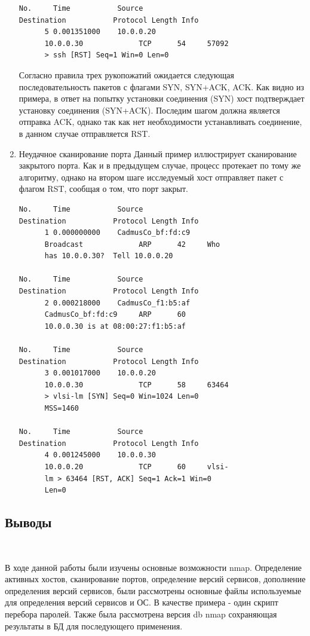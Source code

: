 \documentclass{article}
\begin{document}
\begin{enumerate}
\begin{verbatim}
No.     Time           Source                
Destination           Protocol Length Info
      5 0.001351000    10.0.0.20             
      10.0.0.30             TCP      54     57092 
      > ssh [RST] Seq=1 Win=0 Len=0
\end{verbatim}
Согласно правила трех рукопожатий ожидается следующая последовательность пакетов с флагами SYN, SYN+ACK, ACK. Как видно из примера, в ответ на попытку установки соединения (SYN) хост подтверждает установку соединения (SYN+ACK). Последим шагом должна является отправка ACK, однако так как нет необходимости устанавливать соединение, в данном случае отправляется RST.

\item Неудачное сканирование порта
Данный пример иллюстрирует сканирование закрытого порта. Как и в предыдущем случае, процесс протекает по тому же алгоритму, однако на втором шаге исследуемый хост отправляет пакет с флагом RST, сообщая о том, что порт закрыт.
\begin{verbatim}
No.     Time           Source                
Destination           Protocol Length Info
      1 0.000000000    CadmusCo_bf:fd:c9     
      Broadcast             ARP      42     Who 
      has 10.0.0.30?  Tell 10.0.0.20

No.     Time           Source                
Destination           Protocol Length Info
      2 0.000218000    CadmusCo_f1:b5:af     
      CadmusCo_bf:fd:c9     ARP      60     
      10.0.0.30 is at 08:00:27:f1:b5:af

No.     Time           Source                
Destination           Protocol Length Info
      3 0.001017000    10.0.0.20             
      10.0.0.30             TCP      58     63464 
      > vlsi-lm [SYN] Seq=0 Win=1024 Len=0 
      MSS=1460

No.     Time           Source                
Destination           Protocol Length Info
      4 0.001245000    10.0.0.30             
      10.0.0.20             TCP      60     vlsi-
      lm > 63464 [RST, ACK] Seq=1 Ack=1 Win=0 
      Len=0
\end{verbatim}

\end{enumerate}

\subsection{Выводы}
~

В ходе данной работы были изучены основные возможности nmap. Определение активных хостов, сканирование портов, определение версий сервисов, дополнение определения версий сервисов, были рассмотрены основные файлы используемые для определения версий сервисов и ОС. В качестве примера - один скрипт перебора паролей. Также была рассмотрена версия db nmap сохраняющая результаты в БД для последующего применения. 
\end{document}
